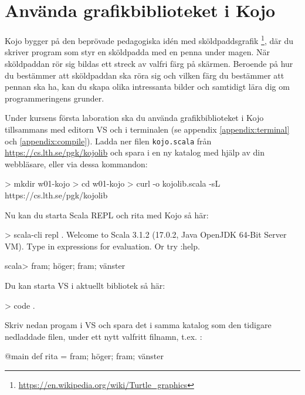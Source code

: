 \section{Använda grafikbiblioteket i Kojo}\label{appendix:ide:kojo:install}

Kojo bygger på den beprövade pedagogiska idén med sköldpaddsgrafik \footnote{\url{https://en.wikipedia.org/wiki/Turtle_graphics}}, där du skriver program som styr en sköldpadda med en penna under magen. När sköldpaddan rör sig bildas ett streck av valfri färg på skärmen. Beroende på hur du bestämmer att sköldpaddan ska röra sig och vilken färg du bestämmer att pennan ska ha, kan du skapa olika intressanta bilder och samtidigt lära dig om programmeringens grunder.

Under kursens första laboration ska du använda grafikbiblioteket i Kojo tillsammans med editorn VS  och  i terminalen (se appendix \ref{appendix:terminal} och \ref{appendix:compile}). Ladda ner filen \texttt{kojo.scala} från \url{https://cs.lth.se/pgk/kojolib} och spara i en ny katalog med hjälp av din webbläsare, eller via dessa kommandon:

\begin{REPLnonum}
> mkdir w01-kojo
> cd w01-kojo
> curl -o kojolib.scala -sL https://cs.lth.se/pgk/kojolib
\end{REPLnonum}

Nu kan du starta Scala REPL och rita med Kojo så här:

\begin{REPLnonum}
> scala-cli repl .
Welcome to Scala 3.1.2 (17.0.2, Java OpenJDK 64-Bit Server VM).
Type in expressions for evaluation. Or try :help.
                                                                                                                               
scala> fram; höger; fram; vänster

\end{REPLnonum}

Du kan starta VS  i aktuellt bibliotek så här:
\begin{REPLnonum}
> code .
\end{REPLnonum}

Skriv nedan progam i VS  och spara det i samma katalog som den tidigare nedladdade filen, under ett nytt valfritt filnamn, t.ex. :

\begin{Code}
@main def rita = fram; höger; fram; vänster
\end{Code}


